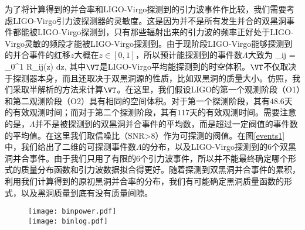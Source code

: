 为了将计算得到的并合率和LIGO-Virgo探测到的引力波事件作比较，我们需要考虑LIGO-Virgo引力波探测器的灵敏度。这是因为并不是所有发生并合的双黑洞事件都能被LIGO-Virgo探测到，只有那些辐射出来的引力波的频率正好处于LIGO-Virgo灵敏的频段才能被LIGO-Virgo探测到。由于现阶段LIGO-Virgo能够探测到的并合事件的红移$z$大概在$z \in [0,1]$，所以预计能探测到的事件数$\Lambda$大致为\cite{Abbott:2016nhf,Abbott:2016drs,Abbott:2017iws,Kavanagh:2018ggo}
\e\label{lambda}
\Lambda_{ij} = \int_{0}^{1} R_{ij}(z)  dz,
\q 
其中$\VT$是LIGO-Virgo平均能探测到的时空体积。$\VT$不仅取决于探测器本身，而且还取决于双黑洞源的性质，比如双黑洞的质量大小。仿照\cite{Abbott:2016nhf,Abbott:2016drs,Usman:2015kfa,Veitch:2014wba}，我们采取半解析的方法来计算$\VT$。在这里，我们假设LIGO的第一个观测阶段（O1）和第二观测阶段（O2）具有相同的空间体积。对于第一个探测阶段，其有$48.6$天的有效观测时间\cite{TheLIGOScientific:2016pea}；而对于第二个探测阶段，其有$117$天的有效观测时间\cite{TheLIGOScientific:2017qsa}。需要注意的是，$\Lambda$并不是被探测到的双黑洞并合事件的平均数，而是超过一定阀值的事件数的平均值\cite{Abbott:2016nhf}。在这里我们取信噪比（SNR>8）作为可探测的阀值。在图\ref{events1}中，我们给出了二维的可探测事件数$\Lambda$的分布，以及LIGO-Virgo探测到的$6$个双黑洞并合事件。由于我们只用了有限的$6$个引力波事件，所以并不能最终确定哪个形式的质量分布函数和引力波数据拟合得更好。随着探测到双黑洞并合事件的累积，利用我们计算得到的原初黑洞并合率的分布，我们有可能确定黑洞质量函数的形式，以及黑洞质量到底有没有质量间隙\cite{Kovetz:2016kpi,Fishbach:2017zga}。

\begin{figure}[htb]
    \centering
    \texttt{[image: binpower.pdf]}\\
    \texttt{[image: binlog.pdf]}
\end{figure}

